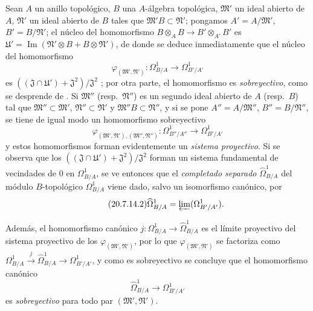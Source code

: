 \begin{env}[20.7.14]
\label{0.20.7.14-fr}
Sean $A$ un anillo topológico, $B$ una $A$-álgebra topológica,
$\mathfrak{M}'$ un ideal abierto de $A$, $\mathfrak{N}'$ un ideal abierto de
$B$ tales que $\mathfrak{M}'B\subset\mathfrak{N}'$; pongamos
$A'=A/\mathfrak{M}'$,
$B'=B/\mathfrak{N}'$; el núcleo del homomorfismo
$B\otimes_A B\to B'\otimes_{A'}B'$ es
$\mathfrak{U}'=\operatorname{Im}(\mathfrak{N}'\otimes B+B\otimes\mathfrak{N}')$,
de donde se deduce inmediatamente que el núcleo del homomorfismo
\begin{equation}
\tag{20.7.14.1}
\label{0.20.7.14.1-fr}
  \varphi_{(\mathfrak{M}',\mathfrak{N}')}:
  \Omega^1_{B/A}\to\Omega^1_{B'/A'}
\end{equation}
es $((\mathfrak{J}\cap\mathfrak{U}')+\mathfrak{J}^2)/\mathfrak{J}^2$ ; por
otra parte, el homomorfismo  es \emph{sobreyectivo}, como se
desprende de . Si $\mathfrak{M}''$ (resp.\
$\mathfrak{N}''$) es un segundo ideal abierto de $A$ (resp.\ $B$) tal que
$\mathfrak{M}''\subset\mathfrak{M}'$, $\mathfrak{N}''\subset\mathfrak{N}'$
y $\mathfrak{M}''B\subset\mathfrak{N}''$, y si se pone
$A''=A/\mathfrak{M}''$, $B''=B/\mathfrak{N}''$, se tiene de igual modo un
homomorfismo sobreyectivo
\[
  \varphi_{(\mathfrak{M}',\mathfrak{N}'),(\mathfrak{M}'',\mathfrak{N}'')}:
  \Omega^1_{B''/A''}\to\Omega^1_{B'/A'}
\]
y estos homomorfismos forman evidentemente un \emph{sistema proyectivo}. Si
se observa que los
$((\mathfrak{J}\cap\mathfrak{U}')+\mathfrak{J}^2)/\mathfrak{J}^2$ forman
un sistema fundamental de vecindades de $0$ en $\Omega^1_{B/A}$, se ve
entonces que el \emph{completado separado} $\widehat{\Omega}^1_{B/A}$ del
módulo $B$-topológico $\Omega^1_{B/A}$ viene dado, salvo un isomorfismo
canónico, por
\begin{equation}
\tag{20.7.14.2}
\label{0.20.7.14.2-fr}
  \widehat{\Omega}^1_{B/A}=\varprojlim(\Omega^1_{B'/A'}).
\end{equation}

Además, el homomorfismo canónico
$j:\Omega^1_{B/A}\to\widehat{\Omega}^1_{B/A}$ es el límite proyectivo del
sistema proyectivo de los $\varphi_{(\mathfrak{M}',\mathfrak{N}')}$, por lo que
$\varphi_{(\mathfrak{M}',\mathfrak{N}')}$ se factoriza como
$\Omega^1_{B/A}\xrightarrow{j}\widehat{\Omega}^1_{B/A}\to
\Omega^1_{B'/A'}$, y como es sobreyectivo se concluye que el homomorfismo
canónico
\begin{equation}
\tag{20.7.14.3}
\label{0.20.7.14.3-fr}
  \widehat{\Omega}^1_{B/A}\to\Omega^1_{B'/A'}
\end{equation}
es \emph{sobreyectivo} para todo par $(\mathfrak{M}',\mathfrak{N}')$.


\end{env}
